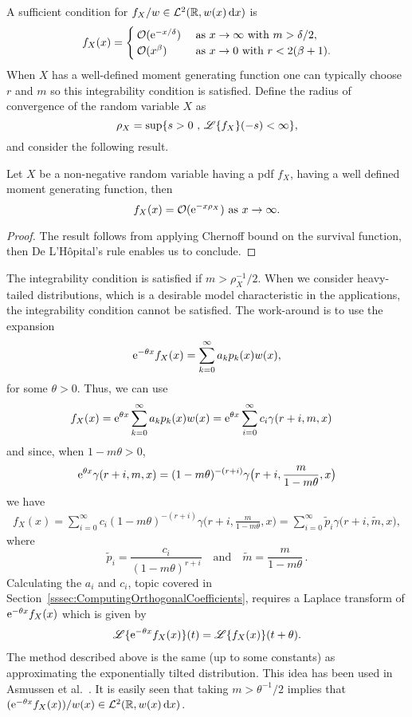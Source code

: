 A sufficient condition for $f_{X}/w\in\mathcal{L}^2(\mathbb{R}, w(x) \mathop{}\!\mathrm{d} x)$ is
\begin{equation*}\label{eq:IntegrabilityCondition}
f_{X}(x)=
\begin{cases}
{\mathcal{O}}(\mathrm{e}^{- x/\delta})&\text{ as }x\rightarrow\infty\text{ with }m>\delta/2,\\
{\mathcal{O}}(x^{\beta})&\text{  as }x\rightarrow0\text{ with } r < 2( \beta + 1).
\end{cases}
\end{equation*}
When $X$ has a well-defined moment generating function one can typically choose $r$ and $m$ so this integrability condition is satisfied. Define the radius of convergence of the random variable $X$ as
$$
\rho_X=\sup\{s>0\text{ , }\mathscr{L}\{f_{X}\}(-s)<\infty\},
$$
and consider the following result.
\begin{proposition}\label{prop:ExpBound}
Let $X$ be a non-negative random variable having a pdf $f_X$, having a well defined moment generating function, then
$$
f_X(x)={\mathcal{O}}(\mathrm{e}^{- x\rho_X})\text{ as }x\rightarrow\infty.
$$
\end{proposition}
\begin{proof}
The result follows from applying Chernoff bound on the survival function, then De L'H\^opital's rule enables us to conclude.
\end{proof}
The integrability condition is satisfied if $m>\rho_X^{-1}/2$. When we consider heavy-tailed distributions, which is a desirable model characteristic in the applications, the integrability condition cannot be satisfied. The work-around is to use the expansion
\[ \mathrm{e}^{-\theta x} f_{X}(x)
= \sum_{k=0}^\infty a_k p_k(x) w(x),  \]
for some $\theta > 0$. Thus, we can use
\begin{align*}
f_{X}(x)
&= \mathrm{e}^{\theta x} \sum_{k=0}^\infty a_k p_k(x) w(x)
=  \mathrm{e}^{\theta x} \sum_{i=0}^{\infty} c_i \gamma(r+i,m,x)
\end{align*}
and since, when $1-m \theta > 0$,
\[ \mathrm{e}^{\theta x} \gamma(r+i, m, x) = (1-m \theta)^{-(r+i)} \gamma\big(r+i, \frac{m}{1-m\theta}, x \big)  \]
we have
\begin{align*}
f_{X}(x)
= \sum_{i=0}^{\infty} c_i (1-m \theta)^{-(r+i)} \gamma\big(r+i, \frac{m}{1-m\theta}, x \big)
= \sum_{i=0}^{\infty} \widetilde{p}_i \gamma\big(r+i, \widetilde{m}, x \big),
\end{align*}
where
\[ \widetilde{p}_i = \frac{ c_i }{(1-m \theta)^{r+i}}
\quad\text{and}\quad
\widetilde{m} = \frac{m}{1-m\theta} \,.
\]
Calculating the $a_i$ and $c_i$, topic covered in Section~\ref{sssec:ComputingOrthogonalCoefficients}, requires a Laplace transform of $\mathrm{e}^{-\theta x} f_{X}(x)$ which is given by
\begin{align*}
\mathscr{L}\{ \mathrm{e}^{-\theta x} f_{X}(x) \}(t)
= \mathscr{L}\{ f_{X}(x) \}(t+\theta).
\end{align*}
The method described above is the same (up to some constants) as approximating the exponentially tilted distribution.
This idea has been used in Asmussen et al.\ \cite{asmussen2016orthonormal}.
It is easily seen that taking $m >\theta^{-1}/2$ implies that $(\mathrm{e}^{-\theta x} f_{X}(x))/w(x)\in\mathcal{L}^2(\mathbb{R}, w(x) \mathop{}\!\mathrm{d} x)$.

